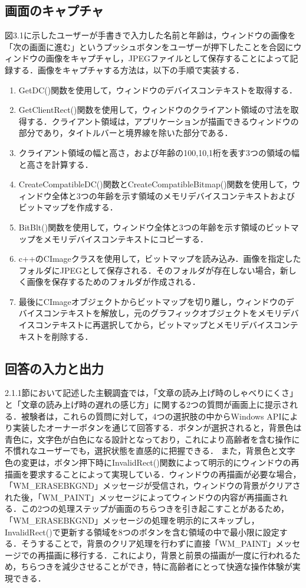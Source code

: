\subsection{画面のキャプチャ}
図3.1に示したユーザーが手書きで入力した名前と年齢は，ウィンドウの画像を「次の画面に進む」というプッシュボタンをユーザーが押下したことを合図にウィンドウの画像をキャプチャし，JPEGファイルとして保存することによって記録する．画像をキャプチャする方法は，以下の手順で実装する．
\begin{enumerate}[leftmargin=*]
  \item GetDC()関数を使用して，ウィンドウのデバイスコンテキストを取得する．
  \item GetClientRect()関数を使用して，ウィンドウのクライアント領域の寸法を取得する．クライアント領域は，アプリケーションが描画できるウィンドウの部分であり，タイトルバーと境界線を除いた部分である．
  \item クライアント領域の幅と高さ，および年齢の100,10,1桁を表す3つの領域の幅と高さを計算する．
  \item CreateCompatibleDC()関数とCreateCompatibleBitmap()関数を使用して，ウィンドウ全体と3つの年齢を示す領域のメモリデバイスコンテキストおよびビットマップを作成する．
  \item BitBlt()関数を使用して，ウィンドウ全体と3つの年齢を示す領域のビットマップをメモリデバイスコンテキストにコピーする．
  \item c++のCImageクラスを使用して，ビットマップを読み込み．画像を指定したフォルダにJPEGとして保存される．そのフォルダが存在しない場合，新しく画像を保存するためのフォルダが作成される．
  \item 最後にCImageオブジェクトからビットマップを切り離し，ウィンドウのデバイスコンテキストを解放し，元のグラフィックオブジェクトをメモリデバイスコンテキストに再選択してから，ビットマップとメモリデバイスコンテキストを削除する．

\end{enumerate}
\subsection{回答の入力と出力}
2.1.1節において記述した主観調査では，「文章の読み上げ時のしゃべりにくさ」と「文章の読み上げ時の遅れの感じ方」に関する2つの質問が画面上に提示される．被験者は，これらの質問に対して，4つの選択肢の中からWindows APIにより実装したオーナーボタンを通じて回答する．ボタンが選択されると，背景色は青色に，文字色が白色になる設計となっており，これにより高齢者を含む操作に不慣れなユーザーでも，選択状態を直感的に把握できる．
また，背景色と文字色の変更は，ボタン押下時にInvalidRect()関数によって明示的にウィンドウの再描画を要求することによって実現している．ウィンドウの再描画が必要な場合，「WM\_ERASEBKGND」メッセージが受信され，ウィンドウの背景がクリアされた後，「WM\_PAINT」メッセージによってウィンドウの内容が再描画される．この2つの処理ステップが画面のちらつきを引き起こすことがあるため，「WM\_ERASEBKGND」メッセージの処理を明示的にスキップし，InvalidRect()で更新する領域を8つのボタンを含む領域の中で最小限に設定する．そうすることで，背景のクリア処理を行わずに直接「WM\_PAINT」メッセージでの再描画に移行する．これにより，背景と前景の描画が一度に行われるため，ちらつきを減少させることができ，特に高齢者にとって快適な操作体験が実現できる．

